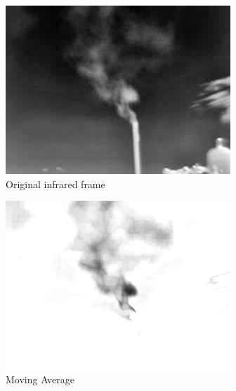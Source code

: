 \begin{figure}[htbp]
\centering
\begin{subfigure}[t]{0.24\textwidth}
\centering
\includegraphics[width=\textwidth]{images/original_frame.png}
\caption{Original infrared frame}
\label{fig:original}
\end{subfigure}%
\hfill%
\begin{subfigure}[t]{0.24\textwidth}
\centering
\includegraphics[width=\textwidth]{images/moving_average.png}
\caption{Moving Average}
\label{fig:moving_avg}
\end{subfigure}%
\hfill%
\begin{subfigure}[t]{0.24\textwidth}
\centering

\end{subfigure}
\end{figure}
